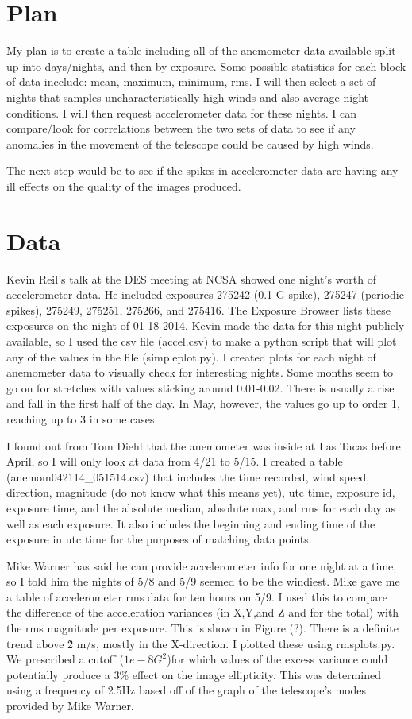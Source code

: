 \documentclass{article}
\begin{document}
\section{Plan}
My plan is to create a table including all of the anemometer data available split up into days/nights, and then by exposure. Some possible statistics for each block of data incclude: mean, maximum, minimum, rms. 
I will then select a set of nights that samples uncharacteristically high winds and also average night conditions. 
I will then request accelerometer data for these nights. 
I can compare/look for correlations between the two sets of data to see if any anomalies in the movement of the telescope could be caused by high winds. 

The next step would be to see if the spikes in accelerometer data are having any ill effects on the quality of the images produced. 

\section{Data}

Kevin Reil's talk at the DES meeting at NCSA showed one night's worth of accelerometer data. 
He included exposures 275242 (0.1 G spike), 275247 (periodic spikes), 275249, 275251, 275266, and 275416. 
The Exposure Browser lists these exposures on the night of 01-18-2014. 
Kevin made the data for this night publicly available, so I used the csv file (accel.csv) to make a python script that will plot any of the values in the file (simpleplot.py).
I created plots for each night of anemometer data to visually check for interesting nights. 
Some months seem to go on for stretches with values sticking around 0.01-0.02. There is usually a rise and fall in the first half of the day.
In May, however, the values go up to order 1, reaching up to 3 in some cases.

I found out from Tom Diehl that the anemometer was inside at Las Tacas before April, so I will only look at data from 4/21 to 5/15. 
I created a table (anemom042114\_051514.csv) that includes the time recorded, wind speed, direction, magnitude (do not know what this means yet), utc time, exposure id, exposure time, and the absolute median, absolute max, and rms for each day as well as each exposure.
 It also includes the beginning and ending time of the exposure in utc time for the purposes of matching data points.

Mike Warner has said he can provide accelerometer info for one night at a time, so I told him the nights of 5/8 and 5/9 seemed to be the windiest. 
Mike gave me a table of accelerometer rms data for ten hours on 5/9. 
I used this to compare the difference of the acceleration variances (in X,Y,and Z and for the total) with the rms magnitude per exposure. 
This is shown in Figure (?). 
There is a definite trend above \~2 m/s, mostly in the X-direction. 
I plotted these using rmsplots.py. 
We prescribed a cutoff ($1e-8 G^{2}$)for which values of the excess variance could potentially produce a 3\% effect on the image ellipticity. 
This was determined using a frequency of 2.5Hz based off of the graph of the telescope's modes provided by Mike Warner.
\end{document}
